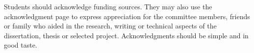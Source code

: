 \begin{acknowledgments}
	Students should acknowledge funding sources. They may also use the acknowledgment page to express appreciation for the committee members, friends or family who aided in the research, writing or technical aspects of the dissertation, thesis or selected project. Acknowledgments should be simple and in good taste.
	{\color{mediumgray} \blindtext}
\end{acknowledgments}
